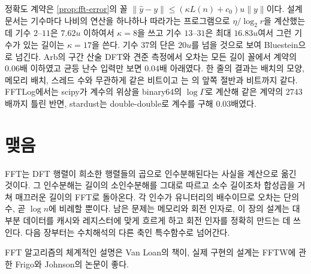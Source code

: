 \begin{instardust}
정확도 계약은 \cref{prop:fft-error}의 꼴 $\|\hat y-y\|\le(\kappa L(n)+c_0)u\|y\|$이다. 설계 문서는 기수마다 나비의 연산을 하나하나 따라가는 프로그램으로 $\eta/\log_2r$을 계산했는데 기수 $2$--$11$은 $7.62u$ 이하여서 $\kappa=8$을 쓰고 기수 $13$--$31$은 최대 $16.83u$여서 그런 기수가 있는 길이는 $\kappa=17$을 쓴다. 기수 $37$의 단은 $20u$를 넘을 것으로 보여 Bluestein으로 넘긴다. Arb의 구간 산술 DFT와 견준 측정에서 오차는 모든 길이 꼴에서 계약의 $0.06$배 이하였고 균등 난수 입력만 보면 $0.04$배 아래였다. 한 줄의 결과는 배치의 모양, 메모리 배치, 스레드 수와 무관하게 같은 비트이고 는 의 앞쪽 절반과 비트까지 같다. FFTLog에서는 scipy가 계수의 위상을 binary64의 $\log\Gamma$로 계산해 같은 계약의 $2743$배까지 틀린 반면, stardust는 double-double로 계수를 구해 $0.03$배였다.
\end{instardust}

\section{맺음}

FFT는 DFT 행렬이 희소한 행렬들의 곱으로 인수분해된다는 사실을 계산으로 옮긴 것이다. 그 인수분해는 길이의 소인수분해를 그대로 따르고 소수 길이조차 합성곱을 거쳐 매끄러운 길이의 FFT로 돌아온다. 각 인수가 유니터리의 배수이므로 오차는 단의 수, 곧 $\log n$에 비례할 뿐이다. 남은 문제는 메모리와 회전 인자로, 이 장의 설계는 대부분 데이터를 캐시와 레지스터에 맞게 흐르게 하고 회전 인자를 정확히 만드는 데 쓰인다. 다음 장부터는 수치해석의 다른 축인 특수함수로 넘어간다.

FFT 알고리즘의 체계적인 설명은 Van Loan의 책\cite{vanloan1992}이, 실제 구현의 설계는 FFTW에 관한 Frigo와 Johnson의 논문\cite{frigo2005fftw}이 좋다.

\chapterreferences
